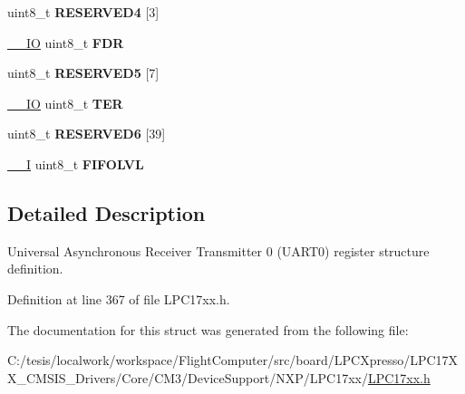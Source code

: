 \begin{DoxyCompactItemize}
\item 
\hypertarget{struct_l_p_c___u_a_r_t0___type_def_ac1a71904047966810554fa03ddffdbf2}{uint8\-\_\-t {\bfseries \-R\-E\-S\-E\-R\-V\-E\-D4} \mbox{[}3\mbox{]}}\label{struct_l_p_c___u_a_r_t0___type_def_ac1a71904047966810554fa03ddffdbf2}

\item 
\hypertarget{struct_l_p_c___u_a_r_t0___type_def_a5c103d92abeb5880ab2dde2f6ed78f57}{\hyperlink{group___c_m_s_i_s__core__definitions_gaec43007d9998a0a0e01faede4133d6be}{\-\_\-\-\_\-\-I\-O} uint8\-\_\-t {\bfseries \-F\-D\-R}}\label{struct_l_p_c___u_a_r_t0___type_def_a5c103d92abeb5880ab2dde2f6ed78f57}

\item 
\hypertarget{struct_l_p_c___u_a_r_t0___type_def_a5d916b8af24a4b9404452640e5229779}{uint8\-\_\-t {\bfseries \-R\-E\-S\-E\-R\-V\-E\-D5} \mbox{[}7\mbox{]}}\label{struct_l_p_c___u_a_r_t0___type_def_a5d916b8af24a4b9404452640e5229779}

\item 
\hypertarget{struct_l_p_c___u_a_r_t0___type_def_a195604b4a6e90d997b832156b842aa3d}{\hyperlink{group___c_m_s_i_s__core__definitions_gaec43007d9998a0a0e01faede4133d6be}{\-\_\-\-\_\-\-I\-O} uint8\-\_\-t {\bfseries \-T\-E\-R}}\label{struct_l_p_c___u_a_r_t0___type_def_a195604b4a6e90d997b832156b842aa3d}

\item 
\hypertarget{struct_l_p_c___u_a_r_t0___type_def_a0cfc37662012c7c04d4539d88baa86f0}{uint8\-\_\-t {\bfseries \-R\-E\-S\-E\-R\-V\-E\-D6} \mbox{[}39\mbox{]}}\label{struct_l_p_c___u_a_r_t0___type_def_a0cfc37662012c7c04d4539d88baa86f0}

\item 
\hypertarget{struct_l_p_c___u_a_r_t0___type_def_a0f9491fddbf10118bf937d4549088659}{\hyperlink{group___c_m_s_i_s__core__definitions_gaf63697ed9952cc71e1225efe205f6cd3}{\-\_\-\-\_\-\-I} uint8\-\_\-t {\bfseries \-F\-I\-F\-O\-L\-V\-L}}\label{struct_l_p_c___u_a_r_t0___type_def_a0f9491fddbf10118bf937d4549088659}

\end{DoxyCompactItemize}


\subsection{\-Detailed \-Description}
\-Universal \-Asynchronous \-Receiver \-Transmitter 0 (\-U\-A\-R\-T0) register structure definition. 

\-Definition at line 367 of file \-L\-P\-C17xx.\-h.



\-The documentation for this struct was generated from the following file\-:\begin{DoxyCompactItemize}
\item 
\-C\-:/tesis/localwork/workspace/\-Flight\-Computer/src/board/\-L\-P\-C\-Xpresso/\-L\-P\-C17\-X\-X\-\_\-\-C\-M\-S\-I\-S\-\_\-\-Drivers/\-Core/\-C\-M3/\-Device\-Support/\-N\-X\-P/\-L\-P\-C17xx/\hyperlink{_l_p_c17xx_8h}{\-L\-P\-C17xx.\-h}\end{DoxyCompactItemize}
